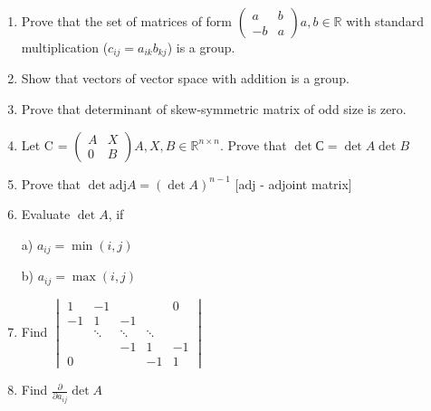 \documentclass{article}
\begin{document}
 	\begin{enumerate}
 		\item Prove that the set of matrices of form  $\left(\begin{matrix}a & b\\ -b & a\end{matrix}\right) a,b \in \mathbb{R}$ with standard multiplication ($c_{ij} = a_{ik} b_{kj}$) is a group.
 		\item Show that vectors of vector space with addition is a group.
 		\item Prove that determinant of skew-symmetric matrix of odd size is zero.
 		
 		\item Let C = $\left(\begin{matrix}A & X\\ 0 & B\end{matrix}\right) A,X, B \in \mathbb{R}^{n \times n}$. Prove that $\det С = \det A \det B$
 		
 		\item Prove that $\det \text{adj} A = (\det A)^{n-1}$ [adj - adjoint matrix]
 		
 		\item Evaluate  $\det A$, if
 		
 		a) $a_{ij} = \min(i,j)$
 		
 		b) $a_{ij} = \max(i,j)$ 
 		
 		\item Find $ \begin{vmatrix}
 		1 & -1 &    &    & 0   \\
 		-1  & 1       & -1   &      &    \\
 		&       \ddots &           \ddots&     \ddots      &    \\
 		&         &           -1&          1 & -1\\
 		0  &         &           &          -1 & 1
 		\end{vmatrix}
 		$
 		
 		\item Find $\frac{\partial} {\partial a_{ij}} \det A$
 	\end{enumerate}
	
 \newpage
 
 
\end{document}
